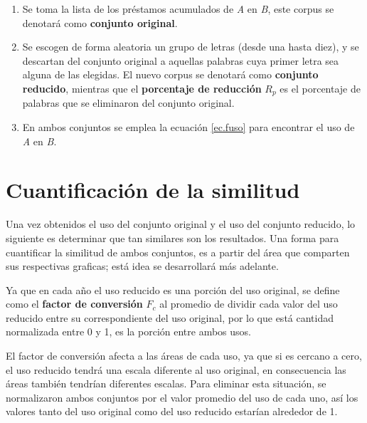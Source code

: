 \begin{enumerate}
	
	\item Se toma la lista de los préstamos acumulados de \textit{A} en \textit{B}, este corpus se denotará como \textbf{conjunto original}.
	
	\item Se escogen de forma aleatoria un grupo de letras (desde una hasta diez), y se descartan del conjunto original a aquellas  palabras cuya primer letra sea alguna de las elegidas. El nuevo corpus se denotará como \textbf{conjunto reducido}, mientras que el \textbf{porcentaje de reducción} $R_{p}$ es el porcentaje de palabras que se eliminaron del conjunto original. 
	
	
	\item En ambos conjuntos se emplea la ecuación \ref{ec.fuso} para encontrar el uso de \textit{A} en \textit{B}. %
	
\end{enumerate}

\section{Cuantificación de la similitud}

Una vez obtenidos el uso del conjunto original y el uso del conjunto reducido, lo siguiente es determinar que tan similares son los resultados. Una forma para cuantificar la similitud de ambos conjuntos, es a partir del área que comparten sus respectivas graficas;  está idea se desarrollará más adelante.  

Ya que en cada año el uso reducido es una porción del uso original, se define como el \textbf{factor de conversión} $F_{c}$ al promedio de dividir cada valor del uso reducido entre su correspondiente del uso original, por lo que está cantidad normalizada entre 0 y 1, es la porción entre ambos usos. 

El factor de conversión afecta a las áreas de cada uso,  ya que si es cercano a cero, el uso reducido tendrá una escala diferente al uso original, en consecuencia las áreas también tendrían diferentes escalas. Para eliminar esta situación, se normalizaron ambos conjuntos por el valor promedio del uso de cada uno,  así los valores tanto del uso original como del uso reducido estarían alrededor de 1.  


